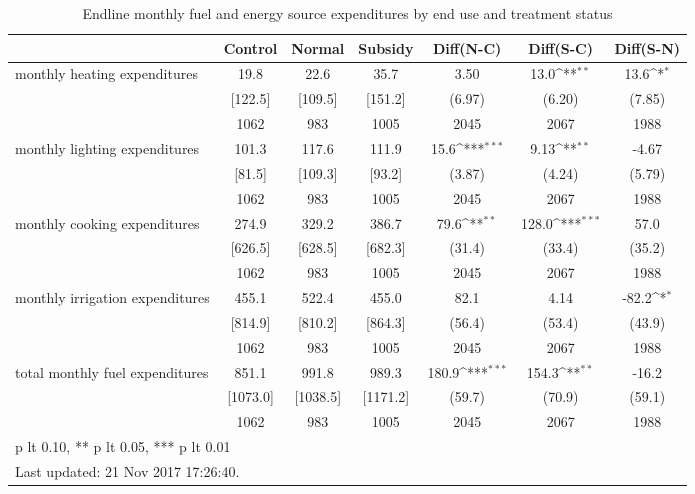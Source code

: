 \begin{table}[htbp]\centering
\def\sym#1{\ifmmode^{#1}\else\(^{#1}\)\fi}
\caption{Endline monthly fuel and energy source expenditures by end use and treatment status \label{tab:"balance"}}
\begin{tabular*}{1\hsize}{@{\hskip\tabcolsep\extracolsep\fill}l*{1}{cccccc}}
\toprule
                                &  Control&   Normal&  Subsidy&Diff(N-C)         &Diff(S-C)         &Diff(S-N)         \\
\midrule
monthly heating expenditures    &     19.8&     22.6&     35.7&     3.50         &     13.0\sym{**} &     13.6\sym{*}  \\
                                &  [122.5]&  [109.5]&  [151.2]&   (6.97)         &   (6.20)         &   (7.85)         \\
                                &     1062&      983&     1005&     2045         &     2067         &     1988         \\
monthly lighting expenditures   &    101.3&    117.6&    111.9&     15.6\sym{***}&     9.13\sym{**} &    -4.67         \\
                                &   [81.5]&  [109.3]&   [93.2]&   (3.87)         &   (4.24)         &   (5.79)         \\
                                &     1062&      983&     1005&     2045         &     2067         &     1988         \\
monthly cooking expenditures    &    274.9&    329.2&    386.7&     79.6\sym{**} &    128.0\sym{***}&     57.0         \\
                                &  [626.5]&  [628.5]&  [682.3]&   (31.4)         &   (33.4)         &   (35.2)         \\
                                &     1062&      983&     1005&     2045         &     2067         &     1988         \\
monthly irrigation expenditures &    455.1&    522.4&    455.0&     82.1         &     4.14         &    -82.2\sym{*}  \\
                                &  [814.9]&  [810.2]&  [864.3]&   (56.4)         &   (53.4)         &   (43.9)         \\
                                &     1062&      983&     1005&     2045         &     2067         &     1988         \\
total monthly fuel expenditures &    851.1&    991.8&    989.3&    180.9\sym{***}&    154.3\sym{**} &    -16.2         \\
                                & [1073.0]& [1038.5]& [1171.2]&   (59.7)         &   (70.9)         &   (59.1)         \\
                                &     1062&      983&     1005&     2045         &     2067         &     1988         \\
\bottomrule
\multicolumn{7}{l}{\footnotesize * p lt 0.10, ** p lt 0.05, *** p lt 0.01}\\
\multicolumn{7}{l}{\footnotesize Last updated: 21 Nov 2017 17:26:40.}\\
\end{tabular*}
\end{table}
